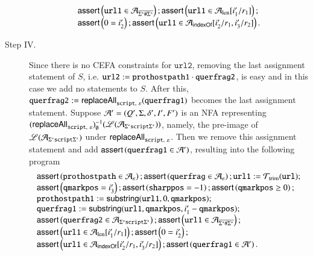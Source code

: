 \begin{description}
\[\begin{array}{l}
		\textsf{assert}\left(\mathtt{url1} \in  \mathcal{A}_{\overline{\Sigma^*\#\Sigma^*}}\right); \textsf{assert}\left(\mathtt{url1} \in \mathcal{A}_{\rm len}[i'_1/r_1]\right); \\
		\textsf{assert}\left(0= i'_2\right); \textsf{assert}\left(\mathtt{url1} \in \mathcal{A}_{\mathsf{indexOf}}[i'_2/r_1, i'_3/r_2]\right).
		\end{array}
		\]
		\item[Step IV.] Since there is no CEFA constraints for $\mathtt{url2}$, removing the last assignment statement of $S$, i.e. $\mathtt{url2} := \mathtt{prothostpath1} \cdot \mathtt{querfrag2}$, is easy and in this case we add no statements to $S$. After this, $\mathtt{querfrag2} := \mathsf{replaceAll}_{\mathtt{script},\ \varepsilon}(\mathtt{querfrag1})$ becomes the last assignment statement. Suppose $\mathcal{A}'=(Q', \Sigma, \delta', I', F')$ is an NFA representing $(\mathsf{replaceAll}_{\mathtt{script},\ \varepsilon})^{-1}_\emptyset(\mathscr{L}(\mathcal{A}_{\Sigma^*\mathtt{script}\Sigma^*}))$, namely, the pre-image of $\mathscr{L}(\mathcal{A}_{\Sigma^*\mathtt{script}\Sigma^*})$ under $\mathsf{replaceAll}_{\mathtt{script},\ \varepsilon}$. Then we remove this assignment statement and add $\textsf{assert}\left(\mathtt{querfrag1 \in \mathcal{A}'}\right)$, resulting into the following program
		\[ 
		\begin{array}{l}
		\textsf{assert}\left(\mathtt{prothostpath} \in \mathcal{A}_\varepsilon\right); \textsf{assert}\left(\mathtt{querfrag} \in \mathcal{A}_\varepsilon\right); \mathtt{url1} := \mathcal{T}_{\rm trim}(\mathtt{url}); \\
		\textsf{assert}\left(\mathtt{qmarkpos} = i'_3\right); \textsf{assert}\left(\mathtt{sharppos} =-1 \right); \textsf{assert}\left(\mathtt{qmarkpos} \ge 0\right); \\ 
		\mathtt{prothostpath1} := \mathsf{substring}(\mathtt{url1}, 0, \mathtt{qmarkpos});\\
		\mathtt{querfrag1} := \mathsf{substring}(\mathtt{url1, qmarkpos}, i'_1 - \mathtt{qmarkpos});\\
		\textsf{assert}\left(\mathtt{querfrag2} \in  \mathcal{A}_{\Sigma^*\mathtt{script}\Sigma^*}\right);  
		\textsf{assert}\left(\mathtt{url1} \in  \mathcal{A}_{\overline{\Sigma^*\#\Sigma^*}}\right); \\
		\textsf{assert}\left(\mathtt{url1} \in \mathcal{A}_{\rm len}[i'_1/r_1]\right);  \textsf{assert}\left(0= i'_2\right); \\
		\textsf{assert}\left(\mathtt{url1} \in \mathcal{A}_{\mathsf{indexOf}}[i'_2/r_1, i'_3/r_2]\right);  \textsf{assert}\left(\mathtt{querfrag1} \in \mathcal{A}'\right).
		\end{array}
		\]
		

\end{description}
